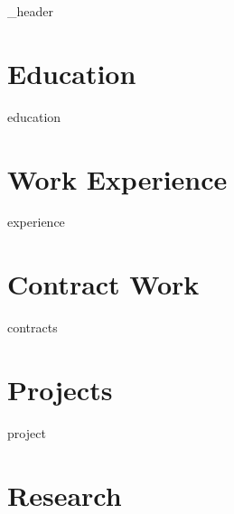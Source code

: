 \documentclass[letter,10pt]{article}
\author{Brian D. Zimmerman}
\begin{document}
{_header}
\vspace*{10pt}

\section{Education}
{education}
\vspace*{10pt}

\section{Work Experience}
{experience}
\vspace*{10pt}

\section{Contract Work}
\vspace*{3pt}
{contracts}
\vspace*{10pt}

\newpage
\section{Projects}
\vspace*{3pt}
{project}
\vspace*{10pt}

\section{Research}
\vspace*{3pt}
\nocite{*}


\end{document}
